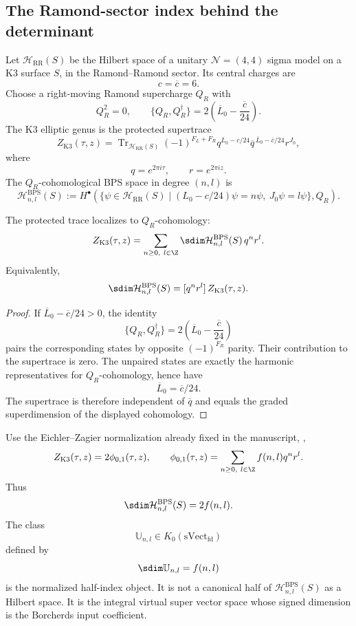 \subsection{The Ramond-sector index behind the determinant}

\begin{definition}
Let $\mathcal H_{\mathrm{RR}}(S)$ be the Hilbert space of a unitary
$\mathcal N=(4,4)$ sigma model on a K3 surface $S$, in the
Ramond--Ramond sector.  Its central charges are
$$c=\overline c=6.$$
Choose a right-moving Ramond supercharge $Q_R$ with
$$Q_R^2=0,\qquad
\{Q_R,Q_R^\dagger\}=2\left(\overline L_0-\frac{\overline c}{24}\right).$$
The K3 elliptic genus is the protected supertrace
$$
Z_{\mathrm{K3}}(\tau,z)=
\operatorname{Tr}_{\mathcal H_{\mathrm{RR}}(S)}
(-1)^{F_L+F_R}q^{L_0-c/24}\overline q^{\,\overline L_0-\overline c/24}
r^{J_0},
$$
where
$$q=e^{2\pi i\tau},\qquad r=e^{2\pi iz}.$$
The $Q_R$-cohomological BPS space in degree $(n,l)$ is
$$
\mathcal H^{\mathrm{BPS}}_{n,l}(S):=
H^\bullet\!\left(
\{\psi\in\mathcal H_{\mathrm{RR}}(S)\mid
(L_0-c/24)\psi=n\psi,\ J_0\psi=l\psi\},Q_R
\right).
$$
\end{definition}

\begin{theorem}
The protected trace localizes to $Q_R$-cohomology:
$$
Z_{\mathrm{K3}}(\tau,z)=
\sum_{n\geq0,\ l\in\Z}
\sdim\mathcal H^{\mathrm{BPS}}_{n,l}(S)\,q^nr^l.
$$
Equivalently,
$$
\sdim\mathcal H^{\mathrm{BPS}}_{n,l}(S)
=[q^nr^l]\,Z_{\mathrm{K3}}(\tau,z).
$$
\end{theorem}

\begin{proof}
If $\overline L_0-\overline c/24>0$, the identity
$$
\{Q_R,Q_R^\dagger\}=2\left(\overline L_0-\frac{\overline c}{24}\right)
$$
pairs the corresponding states by opposite $(-1)^{F_R}$ parity.  Their
contribution to the supertrace is zero.  The unpaired states are exactly
the harmonic representatives for $Q_R$-cohomology, hence have
$$\overline L_0=\overline c/24.$$
The supertrace is therefore independent of $\overline q$ and equals the
graded superdimension of the displayed cohomology.
\end{proof}

\begin{definition}
Use the Eichler--Zagier normalization already fixed in the manuscript,
\cite{EZ:1},
$$
Z_{\mathrm{K3}}(\tau,z)=2\phi_{0,1}(\tau,z),\qquad
\phi_{0,1}(\tau,z)=\sum_{n\geq0,\ l\in\Z}f(n,l)q^nr^l.
$$
Thus
$$
\sdim\mathcal H^{\mathrm{BPS}}_{n,l}(S)=2f(n,l).
$$
The class
$$
\mathbb U_{n,l}\in K_0(\mathrm{sVect}_{\mathrm{fd}})
$$
defined by
$$
\sdim\mathbb U_{n,l}=f(n,l)
$$
is the normalized half-index object.  It is not a canonical half of
$\mathcal H^{\mathrm{BPS}}_{n,l}(S)$ as a Hilbert space.  It is the
integral virtual super vector space whose signed dimension is the
Borcherds input coefficient.
\end{definition}

